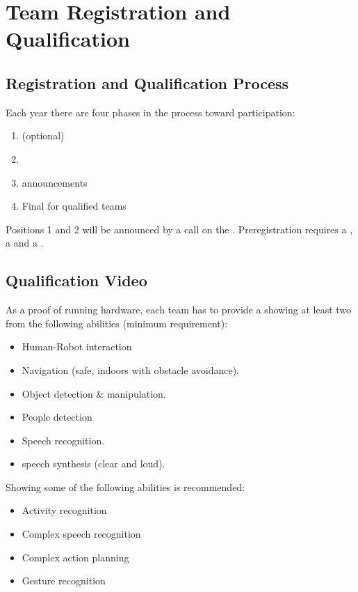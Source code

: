 \section{Team Registration and Qualification}


\subsection{Registration and Qualification Process}
\label{rule:participation}

Each year there are four phases in the process toward participation:
\begin{enumerate}
	\item {} (optional)
	\item {} 
	\item {} announcements
	\item Final  for qualified teams
\end{enumerate}
Positions 1 and 2 will be announced by a call on the . Preregistration requires a , a  and a .

\subsection{Qualification Video}
As a proof of running hardware, each team has to provide a  showing at least two from the following abilities (minimum requirement):
\begin{itemize}
	\item Human-Robot interaction
	\item Navigation (safe, indoors with obstacle avoidance).
	\item Object detection \& manipulation.
	\item People detection
	\item Speech recognition.
	\item speech synthesis (clear and loud).
\end{itemize}

Showing some of the following abilities is recommended:
\begin{itemize}
	\item Activity recognition
	\item Complex speech recognition
	\item Complex action planning
	\item Gesture recognition
\end{itemize}


